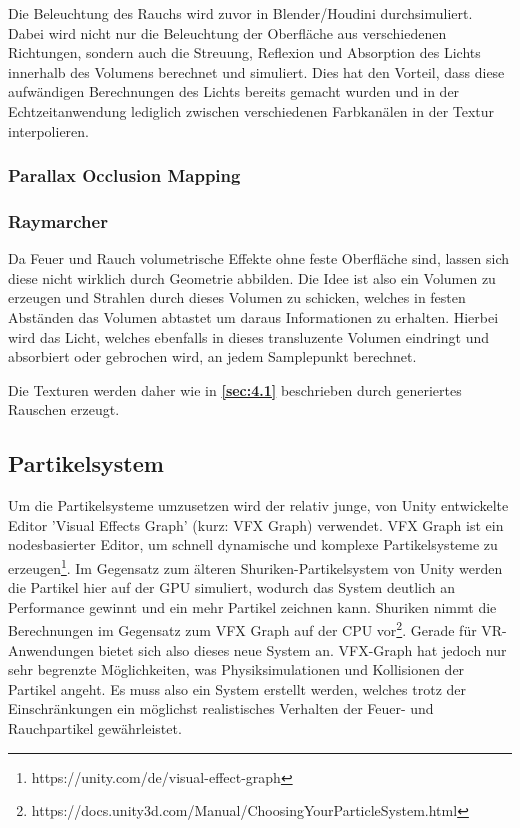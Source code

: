 Die Beleuchtung des Rauchs wird zuvor in Blender/Houdini durchsimuliert. Dabei wird nicht nur die Beleuchtung der Oberfläche aus verschiedenen Richtungen, 
sondern auch die Streuung, Reflexion und Absorption des Lichts innerhalb des Volumens berechnet und simuliert. 
Dies hat den Vorteil, dass diese aufwändigen Berechnungen des Lichts bereits gemacht wurden und in der Echtzeitanwendung lediglich zwischen verschiedenen 
Farbkanälen in der Textur interpolieren.


\subsubsection{Parallax Occlusion Mapping}


\subsubsection{Raymarcher}

Da Feuer und Rauch volumetrische Effekte ohne feste Oberfläche sind, lassen sich diese nicht wirklich durch Geometrie abbilden. Die Idee ist also ein
Volumen zu erzeugen und Strahlen durch dieses Volumen zu schicken, welches in festen Abständen das Volumen abtastet um daraus Informationen zu erhalten.
Hierbei wird das Licht, welches ebenfalls in dieses transluzente Volumen eindringt und absorbiert oder gebrochen wird, an jedem Samplepunkt berechnet.

Die Texturen werden daher wie in \textbf{\autoref{sec:4.1}} beschrieben durch generiertes Rauschen erzeugt.



\subsection{Partikelsystem}
Um die Partikelsysteme umzusetzen wird der relativ junge, von Unity entwickelte Editor 'Visual Effects Graph'
(kurz: VFX Graph) verwendet. VFX Graph ist ein nodesbasierter Editor, um schnell
dynamische und komplexe Partikelsysteme zu erzeugen\footnote{https://unity.com/de/visual-effect-graph}.
Im Gegensatz zum älteren Shuriken-Partikelsystem von Unity werden die Partikel hier auf der GPU
simuliert, wodurch das System deutlich an Performance gewinnt und ein mehr Partikel zeichnen kann.
Shuriken nimmt die Berechnungen im Gegensatz zum VFX Graph auf der CPU vor\footnote{https://docs.unity3d.com/Manual/ChoosingYourParticleSystem.html}.
Gerade für VR-Anwendungen bietet sich also dieses neue System an.
VFX-Graph hat jedoch nur sehr begrenzte Möglichkeiten, was Physiksimulationen und Kollisionen der Partikel angeht.
Es muss also ein System erstellt werden, welches trotz der Einschränkungen ein möglichst realistisches
Verhalten der Feuer- und Rauchpartikel gewährleistet.




\newpage
